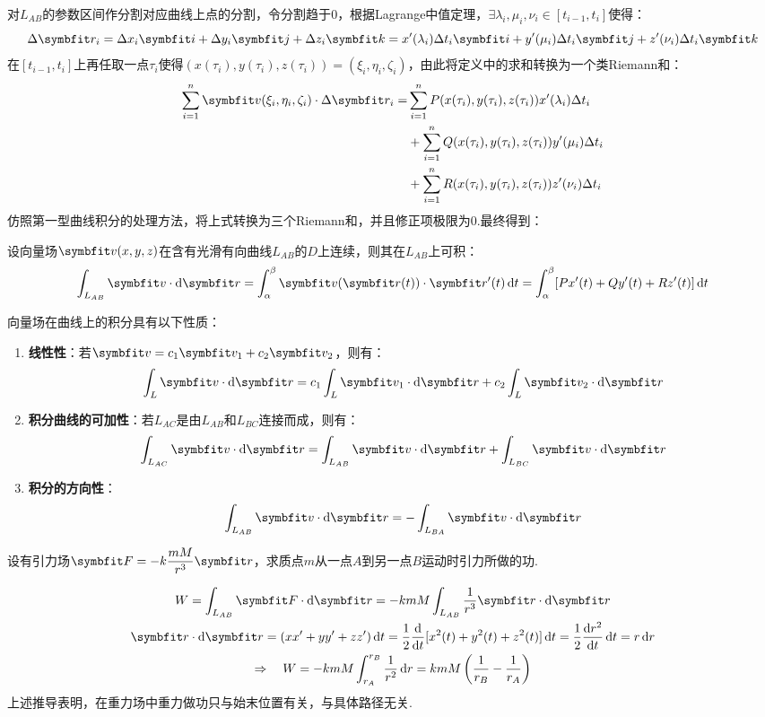 对$L_{AB}$的参数区间作分割对应曲线上点的分割，令分割趋于$0$，根据Lagrange中值定理，$\exists \lambda_i,\mu_i,\nu_i \in [t_{i-1},t_i]$使得：
\[\Delta\vb{r}_i = \Delta x_i\vb{i} + \Delta y_i\vb{j} + \Delta z_i\vb{k} = x'(\lambda_i)\Delta t_i \vb{i} + y'(\mu_i)\Delta t_i \vb{j} + z'(\nu_i)\Delta t_i \vb{k}\]
在$[t_{i-1},t_i]$上再任取一点$\tau_i$使得$(x(\tau_i),y(\tau_i),z(\tau_i)) = (\xi_i,\eta_i,\zeta_i)$，由此将定义中的求和转换为一个类Riemann和：
\begin{align*}
    \sum_{i=1}^{n}\vb{v}(\xi_i,\eta_i,\zeta_i)\cdot\Delta\vb{r}_i =& \sum_{i=1}^{n}P(x(\tau_i),y(\tau_i),z(\tau_i))x'(\lambda_i)\Delta t_i \\
    &+ \sum_{i=1}^{n}Q(x(\tau_i),y(\tau_i),z(\tau_i))y'(\mu_i)\Delta t_i \\
    &+ \sum_{i=1}^{n}R(x(\tau_i),y(\tau_i),z(\tau_i))z'(\nu_i)\Delta t_i
\end{align*}
仿照第一型曲线积分的处理方法，将上式转换为三个Riemann和，并且修正项极限为$0$.最终得到：

\begin{theorem}
    设向量场$\vb{v}(x,y,z)$在含有光滑有向曲线$L_{AB}$的$D$上连续，则其在$L_{AB}$上可积：
    \[\int_{L_{AB}}\vb{v}\cdot\dd{\vb{r}} = \int_{\alpha}^{\beta}\vb{v}(\vb{r}(t))\cdot\vb{r}'(t)\dd{t} = \int_{\alpha}^{\beta}[Px'(t) + Qy'(t) + Rz'(t)]\dd{t}\]
\end{theorem}
向量场在曲线上的积分具有以下性质：
\begin{enumerate}[property]
    \item \textbf{线性性}：若$\vb{v} = c_1\vb{v_1} + c_2\vb{v_2}$，则有：
    \[\int_L\vb{v}\cdot\dd{\vb{r}} = c_1\int_L\vb{v_1}\cdot\dd{\vb{r}} + c_2\int_L\vb{v_2}\cdot\dd{\vb{r}}\]
    \item \textbf{积分曲线的可加性}：若$L_{AC}$是由$L_{AB}$和$L_{BC}$连接而成，则有：
    \[\int_{L_{AC}}\vb{v}\cdot\dd{\vb{r}} = \int_{L_{AB}}\vb{v}\cdot\dd{\vb{r}} + \int_{L_{BC}}\vb{v}\cdot\dd{\vb{r}}\]
    \item \textbf{积分的方向性}：
    \[\int_{L_{AB}}\vb{v}\cdot\dd{\vb{r}} = -\int_{L_{BA}}\vb{v}\cdot\dd{\vb{r}}\]
\end{enumerate}

\begin{question}
    设有引力场$\vb{F}=-k\dfrac{mM}{r^3}\vb{r}$，求质点$m$从一点$A$到另一点$B$运动时引力所做的功.
\end{question}

\begin{solution}
    \begin{gather*}
        W = \int_{L_{AB}}\vb{F}\cdot\dd{\vb{r}} = -kmM\int_{L_{AB}}\frac{1}{r^3}\vb{r}\cdot\dd{\vb{r}}\\
        \vb{r}\cdot\dd{\vb{r}} = (xx'+yy'+zz')\dd{t} = \frac{1}{2}\dv{t}[x^2(t)+y^2(t)+z^2(t)]\dd{t} = \frac{1}{2}\dv{r^2}{t}\dd{t} = r\dd{r}\\
        \Rightarrow\quad W = -kmM\int_{r_A}^{r_B}\frac{1}{r^2}\dd{r} = kmM\left(\frac{1}{r_B}-\frac{1}{r_A}\right)
    \end{gather*}
    上述推导表明，在重力场中重力做功只与始末位置有关，与具体路径无关.
\end{solution}


